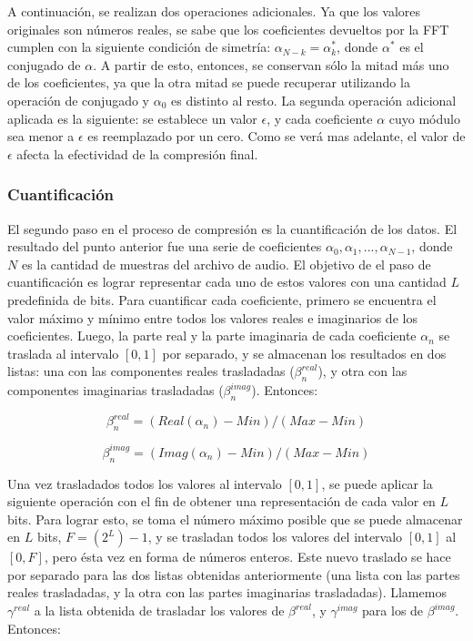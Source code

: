 \documentclass[12pt,a4paper]{article}
\begin{document}
      A continuación, se realizan dos operaciones adicionales.  Ya que los valores originales son números reales, se sabe que los coeficientes devueltos por la FFT cumplen con la siguiente condición de simetría: $\alpha_{N-k} = \alpha^{*}_k$, donde $\alpha^{*}$ es el conjugado de $\alpha$.  A partir de esto, entonces, se conservan sólo la mitad más uno de los coeficientes, ya que la otra mitad se puede recuperar utilizando la operación de conjugado y $\alpha_0$ es distinto al resto.  La segunda operación adicional aplicada es la siguiente: se establece un valor $\epsilon$, y cada coeficiente $\alpha$ cuyo módulo sea menor a $\epsilon$ es reemplazado por un cero.  Como se verá mas adelante, el valor de $\epsilon$ afecta la efectividad de la compresión final.

\subsubsection{Cuantificación}

      El segundo paso en el proceso de compresión es la cuantificación de los datos.  El resultado del punto anterior fue una serie de coeficientes $\alpha_0, \alpha_1, ..., \alpha_{N-1}$, donde $N$ es la cantidad de muestras del archivo de audio.  El objetivo de el paso de cuantificación es lograr representar cada uno de estos valores con una cantidad $L$ predefinida de bits.  Para cuantificar cada coeficiente, primero se encuentra el valor máximo y mínimo entre todos los valores reales e imaginarios de los coeficientes.  Luego, la parte real y la parte imaginaria de cada coeficiente $\alpha_n$ se traslada al intervalo $[0, 1]$ por separado, y se almacenan los resultados en dos listas: una con las componentes reales trasladadas ($\beta^{real}_n$), y otra con las componentes imaginarias trasladadas ($\beta^{imag}_n$).  Entonces:

$$\beta^{real}_n = (Real(\alpha_n) - Min) / (Max - Min)$$

$$\beta^{imag}_n = (Imag(\alpha_n) - Min) / (Max - Min)$$

  Una vez trasladados todos los valores al intervalo $[0, 1]$, se puede aplicar la siguiente operación con el fin de obtener una representación de cada valor en $L$ bits.  Para lograr esto, se toma el número máximo posible que se puede almacenar en $L$ bits, $F = (2^L)-1$, y se trasladan todos los valores del intervalo $[0, 1]$ al $[0, F]$, pero ésta vez en forma de números enteros.  Este nuevo traslado se hace por separado para las dos listas obtenidas anteriormente (una lista con las partes reales trasladadas, y la otra con las partes imaginarias trasladadas).  Llamemos $\gamma^{real}$ a la lista obtenida de trasladar los valores de $\beta^{real}$, y $\gamma^{imag}$ para los de $\beta^{imag}$.  Entonces:
\end{document}
